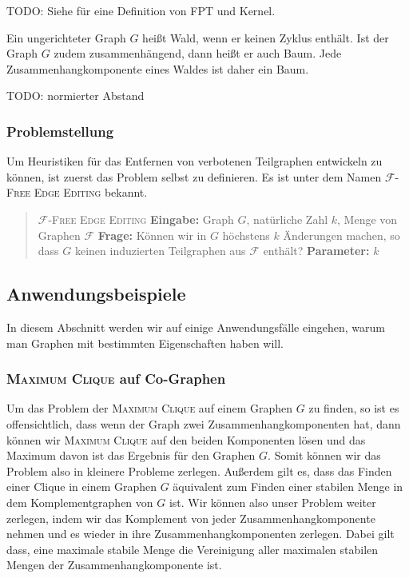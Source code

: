 \documentclass[12pt,a4paper,onecolumn,oneside,titlepage]{article}
\newcommand\cursive[1]{\ensuremath{\mathcal{#1}}}
\begin{document}
TODO: Siehe \cite{Cai96} für eine Definition von FPT und Kernel.

Ein ungerichteter Graph $G$ heißt Wald, wenn er keinen Zyklus enthält. Ist der Graph $G$ zudem zusammenhängend, dann heißt er auch Baum. Jede Zusammenhangkomponente eines Waldes ist daher ein Baum.

TODO: normierter Abstand

\subsubsection{Problemstellung}
\label{sec:problem}
Um Heuristiken für das Entfernen von verbotenen Teilgraphen entwickeln zu können, ist zuerst das Problem selbst zu definieren. Es ist unter dem Namen \textsc{\cursive{F}-Free Edge Editing} bekannt.
\begin{quote}
  \textsc{\cursive{F}-Free Edge Editing}\newline
  \textbf{Eingabe:} Graph $G$, natürliche Zahl $k$, Menge von Graphen \cursive{F}\newline
  \textbf{Frage:} Können wir in $G$ höchstens $k$ Änderungen machen, so dass $G$ keinen induzierten Teilgraphen aus \cursive{F} enthält?\newline
  \textbf{Parameter:} $k$
\end{quote}

\subsection{Anwendungsbeispiele}
\label{sec:examples}
In diesem Abschnitt werden wir auf einige Anwendungsfälle eingehen, warum man Graphen mit bestimmten Eigenschaften haben will.
\subsubsection{\textsc{Maximum Clique} auf Co-Graphen}
Um das Problem der \textsc{Maximum Clique} auf einem Graphen $G$ zu finden, so ist es offensichtlich, dass wenn der Graph zwei Zusammenhangkomponenten hat, dann können wir \textsc{Maximum Clique} auf den beiden Komponenten lösen und das Maximum davon ist das Ergebnis für den Graphen $G$. Somit können wir das Problem also in kleinere Probleme zerlegen.
Außerdem gilt es, dass das Finden einer Clique in einem Graphen $G$ äquivalent zum Finden einer stabilen Menge in dem Komplementgraphen  von $G$ ist.
Wir können also unser Problem weiter zerlegen, indem wir das Komplement von jeder Zusammenhangkomponente nehmen und es wieder in ihre Zusammenhangkomponenten zerlegen. Dabei gilt dass, eine maximale stabile Menge die Vereinigung aller maximalen stabilen Mengen der Zusammenhangkomponente ist.
\end{document}

